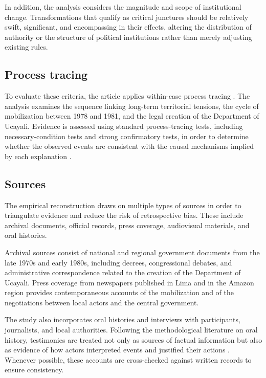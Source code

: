 \documentclass[12pt]{article}
\begin{document}
In addition, the analysis considers the magnitude and scope of
institutional change. Transformations that qualify as critical junctures
should be relatively swift, significant, and encompassing in their
effects, altering the distribution of authority or the structure of
political institutions rather than merely adjusting existing rules.

\subsection*{Process tracing}

To evaluate these criteria, the article applies within-case process
tracing \autocite{george_case_2005}. The analysis examines the
sequence linking long-term territorial tensions, the cycle of
mobilization between 1978 and 1981, and the legal creation of the
Department of Ucayali. Evidence is assessed using standard
process-tracing tests, including necessary-condition tests and strong
confirmatory tests, in order to determine whether the observed events
are consistent with the causal mechanisms implied by each explanation
\autocite{bennett_process_2010}.

\subsection*{Sources}

The empirical reconstruction draws on multiple types of sources in order
to triangulate evidence and reduce the risk of retrospective bias. These
include archival documents, official records, press coverage, audiovisual
materials, and oral histories.

Archival sources consist of national and regional government documents
from the late 1970s and early 1980s, including decrees, congressional
debates, and administrative correspondence related to the creation of
the Department of Ucayali. Press coverage from newspapers published in
Lima and in the Amazon region provides contemporaneous accounts of the
mobilization and of the negotiations between local actors and the central
government.

The study also incorporates oral histories and interviews with
participants, journalists, and local authorities. Following the
methodological literature on oral history, testimonies are treated not
only as sources of factual information but also as evidence of how actors
interpreted events and justified their actions \autocite{thompson_voice_2000}.
Whenever possible, these accounts are cross-checked against written
records to ensure consistency.
\end{document}
